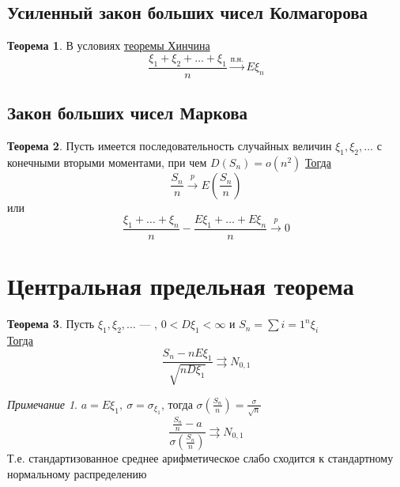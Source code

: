 \documentclass[english]{article}
\theoremstyle{plain}
\theoremstyle{remark}
\newtheorem*{remark}{Примечание}
\theoremstyle{definition}
\newtheorem{theorem}{Теорема}[section]
\begin{document}
\subsection{Усиленный закон больших чисел Колмагорова}
\label{sec:orgb199814}
\begin{theorem}
В условиях \hyperref[org572e196]{теоремы Хинчина}
\[ \frac{\xi_1 + \xi_2 + \dots + \xi_1}{n} \xrightarrow{\text{п.н.}} E\xi_n \]
\end{theorem}
\subsection{Закон больших чисел Маркова}
\label{sec:org63f2cb0}
\begin{theorem}
Пусть имеется последовательность случайных величин \(\xi_1, \xi_2, \dots\) с конечными вторыми моментами, при чем \(D(S_n) = o(n^2)\)
\uline{Тогда}
\[ \frac{S_n}{n} \xrightarrow{p} E \left(\frac{S_n}{n}\right) \]
или
\[ \frac{\xi_1 + \dots + \xi_n}{n} - \frac{E\xi_1 + \dots + E\xi_n}{n} \xrightarrow{p} 0 \]
\end{theorem}
\section{Центральная предельная теорема}
\label{sec:org0335bf7}
\begin{theorem}
Пусть \(\xi_1, \xi_2, \dots\) --- , \(0 < D\xi_1 < \infty\) и \(S_n = \sum{i = 1}^n \xi_i\) \\
\uline{Тогда}
\[ \frac{S_n - nE\xi_1}{\sqrt{nD\xi_1}} \rightrightarrows N_{0,1} \]
\end{theorem}
\begin{remark}
\(a = E\xi_1,\ \sigma = \sigma_{\xi_1}\), тогда \(\sigma \left(\frac{S_n}{n}\right) = \frac{\sigma}{\sqrt{n}}\)
\[ \frac{\frac{S_n}{n} - a}{\sigma \left(\frac{S_n}{n}\right)} \rightrightarrows N_{0,1} \]
Т.е. стандартизованное среднее арифметическое слабо сходится к стандартному нормальному распределению
\end{remark}
\end{document}
